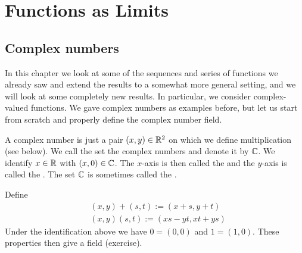 
\chapter{Functions as Limits} \label{approx:chapter}


\section{Complex numbers}
\label{sec:complexnums}


In this chapter we look at some of the sequences and series of functions
we already saw and extend the results to a somewhat more general setting,
and we will look at some completely new results.
In particular, we consider complex-valued functions.
We gave complex numbers as examples before, but
let us start from scratch and properly define the complex number field.

A complex number is just a pair $(x,y) \in {\mathbb{R}}^2$ on which we define
multiplication (see below).
We call the set the complex numbers and denote it by ${\mathbb{C}}$.
We identify $x \in {\mathbb{R}}$ with $(x,0) \in {\mathbb{C}}$.
The $x$-axis is then called the \emph{} and the $y$-axis is
called the \emph{}.  The set ${\mathbb{C}}$ is sometimes called the
\emph{}.

Define
\begin{align*}
& (x,y) + (s,t) := (x+s,y+t) \\
& (x,y) (s,t) := (xs-yt,xt+ys)
\end{align*}
Under the identification above we have $0 = (0,0)$ and $1 = (1,0)$.  These
properties then give a field (exercise).

